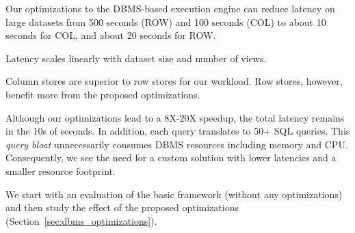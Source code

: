 \begin{denselist}
\item Our optimizations to the DBMS-based execution engine can reduce
latency on large datasets from 500 seconds (ROW) and 100 seconds (COL)
to about 10 seconds for COL, and about 20 seconds for ROW.

\item Latency scales linearly 
with dataset size and number of views.

\item Column stores are superior to row stores 
for our workload. Row stores, however, benefit more from the
proposed optimizations. 

\item Although our optimizations lead to a 8X-20X speedup, the total latency remains in the 10s of seconds.
In addition, each \SeeDB query translates to 50+ SQL queries. 
This {\it query bloat} unnecessarily consumes DBMS resources including memory and CPU.
Consequently, we see the need for a custom solution with  lower latencies and a
smaller resource footprint.
\end{denselist}


We start with an evaluation of the basic framework (without any optimizations) 
and then study the effect of the proposed optimizations (Section~\ref{sec:dbms_optimizations}).

